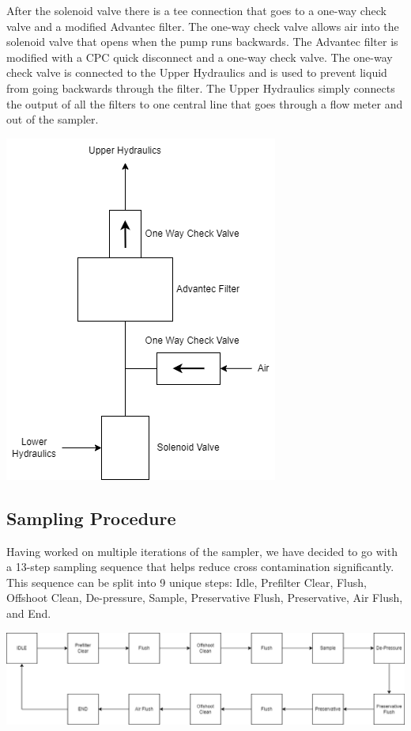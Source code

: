 \documentclass[11pt, letterpaper]{article}
\begin{document}
After the solenoid valve there is a tee connection that goes to a one-way check valve and a modified Advantec filter. The one-way check valve allows air into the solenoid valve that opens when the pump runs backwards. The Advantec filter is modified with a CPC quick disconnect and a one-way check valve. The one-way check valve is connected to the Upper Hydraulics and is used to prevent liquid from going backwards through the filter. The Upper Hydraulics simply connects the output of all the filters to one central line that goes through a flow meter and out of the sampler. 

\begin{center}
	\includegraphics[scale=0.75]{./Assets/PolyWAG_HX_HD_Filter.png}
\end{center}

\subsection{Sampling Procedure}
Having worked on multiple iterations of the sampler, we have decided to go with a 13-step sampling sequence that helps reduce cross contamination significantly. This sequence can be split into 9 unique steps: Idle, Prefilter Clear, Flush, Offshoot Clean, De-pressure, Sample, Preservative Flush, Preservative, Air Flush, and End.

\begin{center}
	\includegraphics[scale=0.45]{./Assets/Sampling Sequence.drawio.png}
\end{center}
\end{document}
